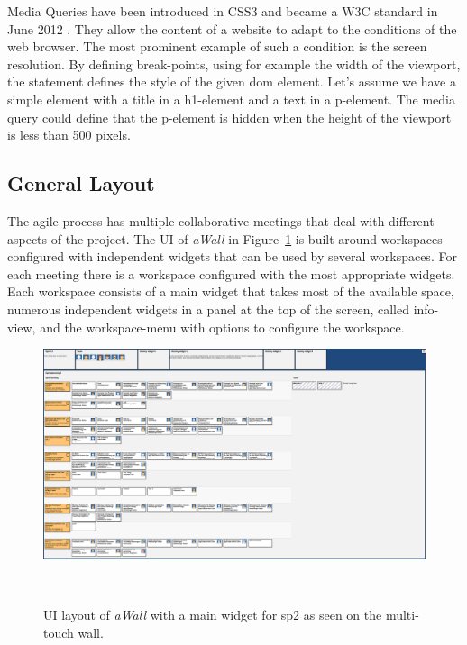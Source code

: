 \documentclass{sigchi}
\begin{document}
Media Queries have been introduced in CSS3 and became a W3C standard in June 2012 \cite{mediaqueriesW3C}.
They allow the content of a website to adapt to the conditions of the web browser.
The most prominent example of such a condition is the screen resolution.
By defining break-points, using for example the width of the viewport, the statement defines the style of the given \gls{dom} element.
Let's assume we have a simple element with a title in a h1-element and a text in a p-element.
The media query could define that the p-element is hidden when the height of the viewport is less than 500 pixels.


\subsection{General Layout}
The agile process has multiple collaborative meetings that deal with different aspects of the project.
The UI of \textit{aWall} in Figure~\ref{fig:awall-layout} is built around workspaces configured with independent widgets that can be used by several workspaces.
For each meeting there is a workspace configured with the most appropriate widgets.
Each workspace consists of a main widget that takes most of the available space, numerous independent widgets in a panel at the top of the screen, called info-view, and the workspace-menu with options to configure the workspace.

\begin{figure}[h]
	\centering
	\includegraphics[width=\columnwidth]{figures/awall-layout}
	\caption{UI layout of \textit{aWall} with a main widget for \gls{sp2} as seen on the multi-touch wall.}~\label{fig:awall-layout}
\end{figure}
\end{document}
